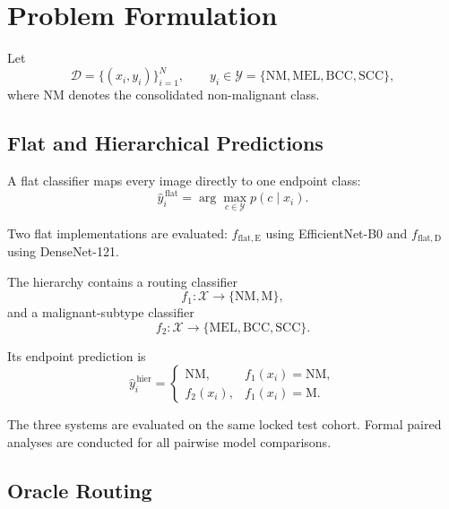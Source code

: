 \section{Problem Formulation}
\label{sec:problem_statement}

Let
\begin{equation}
\mathcal{D}=\{(x_i,y_i)\}_{i=1}^{N},
\qquad
y_i\in
\mathcal{Y}
=
\{
\mathrm{NM},
\mathrm{MEL},
\mathrm{BCC},
\mathrm{SCC}
\},
\end{equation}
where $\mathrm{NM}$ denotes the consolidated non-malignant class.

\subsection{Flat and Hierarchical Predictions}

A flat classifier maps every image directly to one endpoint class:
\begin{equation}
\hat{y}^{\,\mathrm{flat}}_i
=
\arg\max_{c\in\mathcal{Y}}
p(c\mid x_i).
\end{equation}

Two flat implementations are evaluated:
$f_{\mathrm{flat,E}}$ using EfficientNet-B0 and
$f_{\mathrm{flat,D}}$ using DenseNet-121.

The hierarchy contains a routing classifier
\begin{equation}
f_1:\mathcal{X}\rightarrow\{\mathrm{NM},\mathrm{M}\},
\end{equation}
and a malignant-subtype classifier
\begin{equation}
f_2:\mathcal{X}\rightarrow
\{\mathrm{MEL},\mathrm{BCC},\mathrm{SCC}\}.
\end{equation}

Its endpoint prediction is
\begin{equation}
\hat{y}^{\,\mathrm{hier}}_i =
\begin{cases}
\mathrm{NM}, & f_1(x_i)=\mathrm{NM},\\
f_2(x_i),    & f_1(x_i)=\mathrm{M}.
\end{cases}
\label{eq:hierarchical_prediction}
\end{equation}

The three systems are evaluated on the same locked test cohort.
Formal paired analyses are conducted for all pairwise model comparisons.

\subsection{Oracle Routing}


